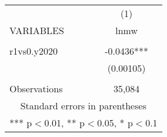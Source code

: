 \begin{tabular}{lc} \hline
 & (1) \\
VARIABLES & lnmw \\ \hline
 &  \\
r1vs0.y2020 & -0.0436*** \\
 & (0.00105) \\
 &  \\
 Observations & 35,084 \\ \hline
\multicolumn{2}{c}{ Standard errors in parentheses} \\
\multicolumn{2}{c}{ *** p$<$0.01, ** p$<$0.05, * p$<$0.1} \\
\end{tabular}
